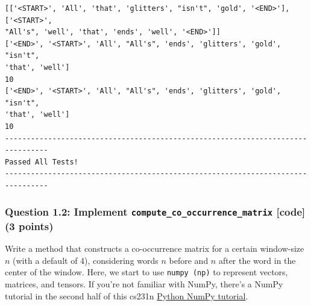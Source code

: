 \documentclass[11pt]{article}
\begin{document}
    \begin{Verbatim}[commandchars=\\\{\}]
[['<START>', 'All', 'that', 'glitters', "isn't", 'gold', '<END>'], ['<START>',
"All's", 'well', 'that', 'ends', 'well', '<END>']]
['<END>', '<START>', 'All', "All's", 'ends', 'glitters', 'gold', "isn't",
'that', 'well']
10
['<END>', '<START>', 'All', "All's", 'ends', 'glitters', 'gold', "isn't",
'that', 'well']
10
--------------------------------------------------------------------------------
Passed All Tests!
--------------------------------------------------------------------------------
    \end{Verbatim}

    \subsubsection{\texorpdfstring{Question 1.2: Implement
\texttt{compute\_co\_occurrence\_matrix} {[}code{]} (3
points)}{Question 1.2: Implement compute\_co\_occurrence\_matrix {[}code{]} (3 points)}}\label{question-1.2-implement-compute_co_occurrence_matrix-code-3-points}

Write a method that constructs a co-occurrence matrix for a certain
window-size \(n\) (with a default of 4), considering words \(n\) before
and \(n\) after the word in the center of the window. Here, we start to
use \texttt{numpy\ (np)} to represent vectors, matrices, and tensors. If
you're not familiar with NumPy, there's a NumPy tutorial in the second
half of this cs231n
\href{http://cs231n.github.io/python-numpy-tutorial/}{Python NumPy
tutorial}.
\end{document}
